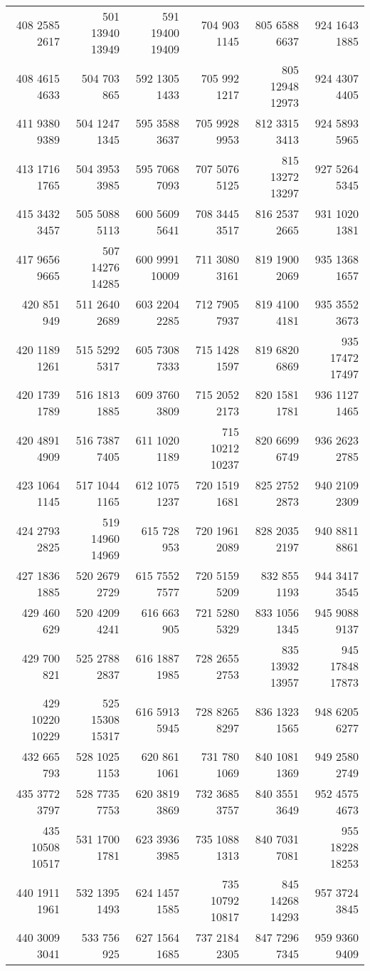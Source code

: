 \begin{center}
\begin{longtable}[c]{*{6}{r}}
408 2585 2617&501 13940 13949&591 19400 19409&704 903 1145&805 6588 6637&924 1643 1885\\
408 4615 4633&504 703 865&592 1305 1433&705 992 1217&805 12948 12973&924 4307 4405\\
411 9380 9389&504 1247 1345&595 3588 3637&705 9928 9953&812 3315 3413&924 5893 5965\\
413 1716 1765&504 3953 3985&595 7068 7093&707 5076 5125&815 13272 13297&927 5264 5345\\
415 3432 3457&505 5088 5113&600 5609 5641&708 3445 3517&816 2537 2665&931 1020 1381\\
417 9656 9665&507 14276 14285&600 9991 10009&711 3080 3161&819 1900 2069&935 1368 1657\\
420 851 949&511 2640 2689&603 2204 2285&712 7905 7937&819 4100 4181&935 3552 3673\\
420 1189 1261&515 5292 5317&605 7308 7333&715 1428 1597&819 6820 6869&935 17472 17497\\
420 1739 1789&516 1813 1885&609 3760 3809&715 2052 2173&820 1581 1781&936 1127 1465\\
420 4891 4909&516 7387 7405&611 1020 1189&715 10212 10237&820 6699 6749&936 2623 2785\\
423 1064 1145&517 1044 1165&612 1075 1237&720 1519 1681&825 2752 2873&940 2109 2309\\
424 2793 2825&519 14960 14969&615 728 953&720 1961 2089&828 2035 2197&940 8811 8861\\
427 1836 1885&520 2679 2729&615 7552 7577&720 5159 5209&832 855 1193&944 3417 3545\\
429 460 629&520 4209 4241&616 663 905&721 5280 5329&833 1056 1345&945 9088 9137\\
429 700 821&525 2788 2837&616 1887 1985&728 2655 2753&835 13932 13957&945 17848 17873\\
429 10220 10229&525 15308 15317&616 5913 5945&728 8265 8297&836 1323 1565&948 6205 6277\\
432 665 793&528 1025 1153&620 861 1061&731 780 1069&840 1081 1369&949 2580 2749\\
435 3772 3797&528 7735 7753&620 3819 3869&732 3685 3757&840 3551 3649&952 4575 4673\\
435 10508 10517&531 1700 1781&623 3936 3985&735 1088 1313&840 7031 7081&955 18228 18253\\
440 1911 1961&532 1395 1493&624 1457 1585&735 10792 10817&845 14268 14293&957 3724 3845\\
440 3009 3041&533 756 925&627 1564 1685&737 2184 2305&847 7296 7345&959 9360 9409\\

\end{longtable}
\end{center}
